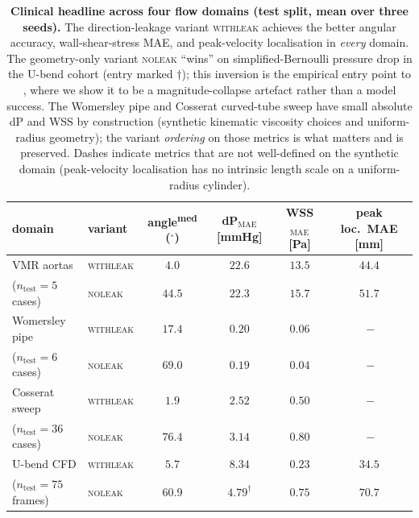 \documentclass[10pt,a4paper]{article}
\newcommand{\withleak}{\textsc{withleak}}
\newcommand{\noleak}{\textsc{noleak}}
\begin{document}
\begin{table}[h]
\centering
\small
\setlength{\tabcolsep}{4pt}
\begin{tabular}{llcccc}
\toprule
domain & variant & angle\textsuperscript{med} ($^\circ$) & dP$_\mathrm{MAE}$ [mmHg] & WSS$_\mathrm{MAE}$ [Pa] & peak loc.\ MAE [mm] \\
\midrule
VMR aortas                     & \withleak{} & $4.0$  & $22.6$ & $13.5$ & $44.4$ \\
($n_\mathrm{test}=5$ cases)    & \noleak{}   & $44.5$ & $22.3$ & $15.7$ & $51.7$ \\
\midrule
Womersley pipe                 & \withleak{} & $17.4$ & $0.20$ & $0.06$ & $\ -$ \\
($n_\mathrm{test}=6$ cases)    & \noleak{}   & $69.0$ & $0.19$ & $0.04$ & $\ -$ \\
\midrule
Cosserat sweep                 & \withleak{} & $1.9$  & $2.52$ & $0.50$ & $\ -$ \\
($n_\mathrm{test}=36$ cases)   & \noleak{}   & $76.4$ & $3.14$ & $0.80$ & $\ -$ \\
\midrule
U-bend CFD                     & \withleak{} & $\mathbf{5.7}$ & $8.34$ & $\mathbf{0.23}$ & $\mathbf{34.5}$ \\
($n_\mathrm{test}=75$ frames)  & \noleak{}   & $60.9$ & $\mathbf{4.79}^\dagger$ & $0.75$ & $70.7$ \\
\bottomrule
\end{tabular}
\caption{\textbf{Clinical headline across four flow domains
(test split, mean over three seeds).} The direction-leakage variant
\withleak{} achieves the better angular accuracy, wall-shear-stress
MAE, and peak-velocity localisation in \emph{every} domain. The
geometry-only variant \noleak{} ``wins'' on simplified-Bernoulli
pressure drop in the U-bend cohort (entry marked $\dagger$); this
inversion is the empirical entry point to ,
where we show it to be a magnitude-collapse artefact rather than a
model success. The Womersley pipe and Cosserat curved-tube sweep
have small absolute dP and WSS by construction (synthetic kinematic
viscosity choices and uniform-radius geometry); the variant
\emph{ordering} on those metrics is what matters and is preserved.
Dashes indicate metrics that are not well-defined on the synthetic
domain (peak-velocity localisation has no intrinsic length scale
on a uniform-radius cylinder).}
\label{tab:clin_headline}
\end{table}
\end{document}
